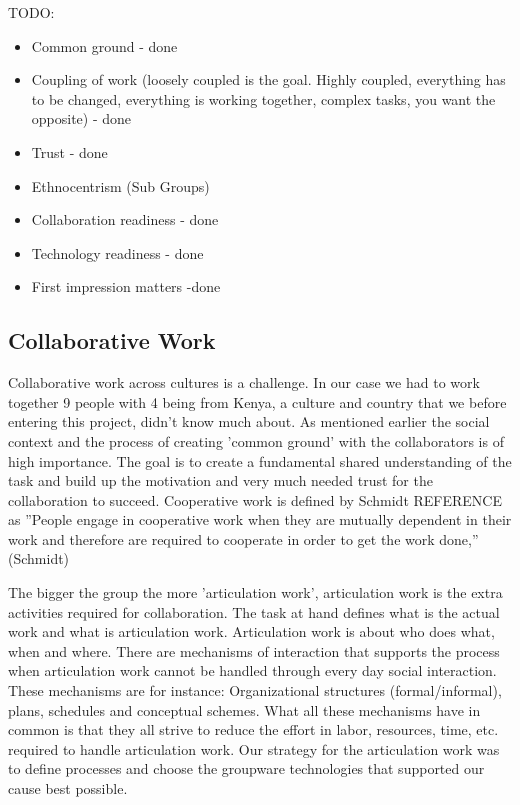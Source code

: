 TODO:
\begin{itemize}
  \item Common ground - done
  \item Coupling of work (loosely coupled is the goal. Highly coupled, everything has to be changed, everything is working together, complex tasks, you want the opposite) - done
  \item Trust - done
	\item Ethnocentrism (Sub Groups)
	\item Collaboration readiness - done
	\item Technology readiness - done
	\item First impression matters -done
\end{itemize}

\subsection{Collaborative Work}
Collaborative work across cultures is a challenge. In our case we had to work together 9 people with 4 being from Kenya, a culture and country that we before entering this project, didn't know much about. As mentioned earlier the social context and the process of creating 'common ground' with the collaborators is of high importance. The goal is to create a fundamental shared understanding of the task and build up the motivation and very much needed trust for the collaboration to succeed. Cooperative work is defined by Schmidt REFERENCE as ''People engage in cooperative work when they are mutually dependent in their work and therefore are required to cooperate in order to get the work done,'' (Schmidt)

The bigger the group the more 'articulation work', articulation work is the extra activities required for collaboration. The task at hand defines what is the actual work and what is articulation work. Articulation work is about who does what, when and where. There are mechanisms of interaction that supports the process when articulation work cannot be handled through every day social interaction. These mechanisms are for instance: Organizational structures (formal/informal), plans, schedules and conceptual schemes. What all these mechanisms have in common is that they all strive to reduce the effort in labor, resources, time, etc. required to handle articulation work. 
Our strategy for the articulation work was to define processes and choose the groupware technologies that supported our cause best possible. 


